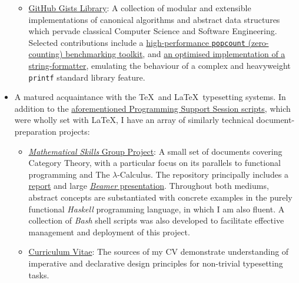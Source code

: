 \documentclass{article}
\newcommand{\githublink}[2]{\href{https://github.com/oliverdixon/#1}{#2}}
\newcommand{\gistlink}[2]{\href{https://gist.github.com/oliverdixon/#1}{#2}}
\newcommand{\weblink}[2]{\href{https://www-users.york.ac.uk/~od641/#1}{#2}}
\begin{document}
\begin{itemize}
\begin{itemize}
                \item \gistlink{}{GitHub Gists Library}: A collection of modular
                and extensible implementations of canonical algorithms and
                abstract data structures which pervade classical Computer
                Science and Software Engineering.  Selected contributions
                include a
                \gistlink{4cb5cf0f918957ca0cd35306635772cc}{high-performance
                \texttt{popcount} (zero-counting) benchmarking toolkit}, and
                \gistlink{b0c4984b7004518309bb67d6c5f6ae7d\#file-sztoa-c}{an
                optimised implementation of a string-formatter}, emulating the
                behaviour of a complex and heavyweight \texttt{printf} standard
                library feature.
        \end{itemize}
        \item A matured acquaintance with the \TeX\ and \LaTeX\ typesetting
        systems. In addition to the \weblink{pss}{aforementioned Programming
        Support Session scripts}, which were wholly set with \LaTeX, I have an
        array of similarly technical document-preparation projects:
        \begin{itemize}
                \item \githublink{MS1GP}{\textit{Mathematical Skills} Group
                Project}: A small set of documents covering Category Theory,
                with a particular focus on its parallels to functional
                programming and The $\lambda$-Calculus. The repository
                principally includes a
                \githublink{MS1GP/blob/master/report/report.tex}{report} and
                large
                \githublink{MS1GP/blob/master/presentation/presentation.tex}%
                        {\textit{Beamer} presentation}. Throughout both mediums,
                abstract concepts are substantiated with concrete examples in
                the purely functional \textit{Haskell} programming language, in
                which I am also fluent. A collection of \textit{Bash} shell
                scripts was also developed to facilitate effective management
                and deployment of this project.

                \item \githublink{cv}{Curriculum Vitae}: The sources of my CV
                demonstrate understanding of imperative and declarative design
                principles for non-trivial typesetting tasks.


\end{itemize}
\end{itemize}
\end{document}
